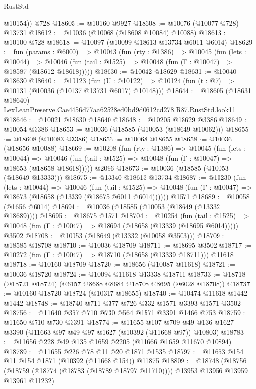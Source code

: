 \begin{lexlean}{RustStd}
\begin{coremodule}
{{        @10154))
    @728
@18605 := @10160 @9927
@18608 := @10076 (@10077 @728) @13731
@18612 := @10036 (@10068 (@18608 @10084) @10088)
@18613 := @10100 @728
@18618 := @10097 (@10099 @18613 @13734 @6011 @6014)
@18629 := fun (params : @6000) =>
  @10043
    (fun (rty : @1386) =>
    @10045
      (fun (lets : @10044) =>
      @10046 (fun (tail : @1525) => @10048 (fun (Γ : @10047) => @18587 (@18612 @18618)))))
@18630 := @10042 @18629
@18631 := @10040 @18630
@18640 := @10123
    (fun (U : @10122) => @10124 (fun (t : @7) => @10131 (@10036 (@10137 @13731 @6017) @10148)))
@18644 := @18605
    (@18631 @18640)
    LexLeanPreserve.Cae4456d77aa62528ed0bd9d0612cd278.R87.RustStd.look11
@18646 := @10021 @18630 @18640
@18648 := @10205 @18629 @3386
@18649 := @10054 @3386
@18653 := @10036 (@18585 (@10053 (@18649 @10062)))
@18655 := @18608 (@10083 @3386)
@18656 := @10068 @18655
@18658 := @10036 (@18656 @10088)
@18669 := @10208
    (fun (rty : @1386) =>
    @10045
      (fun (lets : @10044) =>
      @10046 (fun (tail : @1525) => @10048 (fun (Γ : @10047) => @18653 (@18658 @18618)))))
    @2096
@18673 := @10036 (@18585 (@10053 (@18649 @13333)))
@18675 := @13340 @18613 @13734
@18687 := @10230
    (fun (lets : @10044) =>
    @10046
      (fun (tail : @1525) =>
      @10048 (fun (Γ : @10047) => @18673 (@18658 (@13339 (@18675 @6011 @6014))))))
    @1571
@18689 := @10058 (@1656 @6014)
@18694 := @10036 (@18585 (@10053 (@18649 (@13332 @18689))))
@18695 := @18675 @1571
@18704 := @10254
    (fun (tail : @1525) => @10048 (fun (Γ : @10047) => @18694 (@18658 (@13339 (@18695 @6014)))))
    @3502
@18708 := @10053 (@18649 (@13332 (@10058 @3503)))
@18709 := @18585 @18708
@18710 := @10036 @18709
@18711 := @18695 @3502
@18717 := @10272 (fun (Γ : @10047) => @18710 (@18658 (@13339 @18711))) @11618
@18718 := @10160 @18709
@18720 := @18656 (@10087 @11618)
@18721 := @10036 @18720
@18724 := @10094 @11618 @13338 @18711
@18733 := @18718 (@18721 @18724) (@6157 @8688 @8684 @18708 @8695 (@6028 @18708))
@18737 := @10160 @18720 @18724 (@10317 @18655)
@18740 := @10474 @11618 @1442 @1442
@18748 := @18740 @711 @377 @726 @332 @1571 @3393 @1571 @3502
@18756 := @11640 @367 @710 @730 @564 @1571 @3391 @1466 @753
@18759 := @11650 @710 @730 @3391
@18774 := @11655
    @107
    @709
    @49
    @136
    @1627
    @3390
    (@11663 @97 @49 @97 @1627 (@10392 (@11668 @97)) @10803)
@18783 := @11656 @228 @49 @135 @1659 @2205 (@11666 @1659 @11670 @10894)
@18789 := @11655 @226 @78 @11 @20 @1871 @1535
@18797 := @11663 @154 @11 @154 @1871 (@10392 (@11668 @154)) @11875
@18809 := @18748
    (@18756 (@18759 (@18774 (@18783 (@18789 @18797 @11710)))) @13953 @13956 @13959 @13961 @11232)
}}
\end{coremodule}
\end{lexlean}
